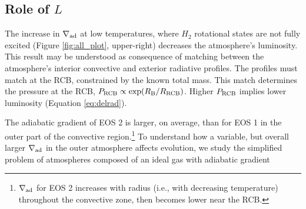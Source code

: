 \subsection{Role of $L$}\label{sec:roleofL}




The increase in $\nabla_{\rm ad}$ at low temperatures, where $H_2$ rotational states are not fully excited (Figure \ref{fig:all_plot}, upper-right) decreases the atmosphere's luminosity.
This result may be understood as consequence of matching between the atmosphere's interior convective and exterior radiative profiles.  The profiles must match at the RCB, constrained by the known total mass.  This match determines the pressure at the RCB, $P_{\rm RCB} \propto \exp(R_{\rm B}/R_{\rm RCB})$. Higher $P_{\rm RCB}$ implies lower luminosity (Equation \ref{eq:delrad}).

The adiabatic gradient of EOS 2 is larger, on average, than for EOS 1 in the outer part of the convective region.\footnote {$\nabla_{\rm ad}$ for EOS 2 increases with radius (i.e., with decreasing temperature) throughout the convective zone, then becomes lower near the RCB.} To understand how a variable, but overall larger $\nabla_{\rm ad}$ in the outer atmosphere affects evolution, we study the simplified problem of atmospheres composed of an ideal gas with adiabatic gradient 

